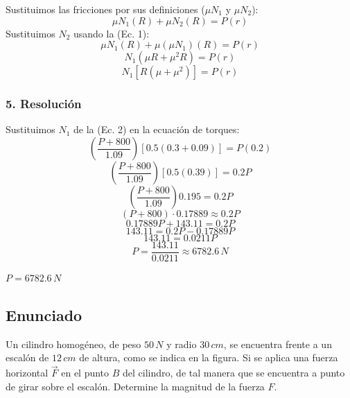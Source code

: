 \documentclass[12pt, a4paper]{article}
\begin{document}
Sustituimos las fricciones por sus definiciones ($\mu N_1$ y $\mu N_2$):
$$\mu N_1 (R) + \mu N_2 (R) = P(r)$$
Sustituimos $N_2$ usando la (Ec. 1):
$$\mu N_1 (R) + \mu (\mu N_1) (R) = P(r)$$
$$N_1 (\mu R + \mu^2 R) = P(r)$$
$$N_1 [R(\mu + \mu^2)] = P(r)$$

\subsubsection*{5. Resolución}
Sustituimos $N_1$ de la (Ec. 2) en la ecuación de torques:
$$\left( \frac{P + 800}{1.09} \right) [0.5(0.3 + 0.09)] = P(0.2)$$
$$\left( \frac{P + 800}{1.09} \right) [0.5(0.39)] = 0.2P$$
$$\left( \frac{P + 800}{1.09} \right) 0.195 = 0.2P$$
$$(P + 800) \cdot 0.17889 \approx 0.2P$$
$$0.17889P + 143.11 = 0.2P$$
$$143.11 = 0.2P - 0.17889P$$
$$143.11 = 0.0211P$$
$$P = \frac{143.11}{0.0211} \approx 6782.6 \, \si{N}$$

\begin{tcolorbox}[colback=green!5!white, colframe=green!50!black, title=Respuesta Final]
\centering \Large $P = 6782.6 \, \si{N}$
\end{tcolorbox}

\newpage

\subsection*{Enunciado}
Un cilindro homogéneo, de peso $50 \, \si{N}$ y radio $30 \, \si{cm}$, se encuentra frente a un escalón de $12 \, \si{cm}$ de altura, como se indica en la figura. Si se aplica una fuerza horizontal $\vec{F}$ en el punto $B$ del cilindro, de tal manera que se encuentra a punto de girar sobre el escalón. Determine la magnitud de la fuerza $F$.

\begin{center}
\end{center}
\end{document}
